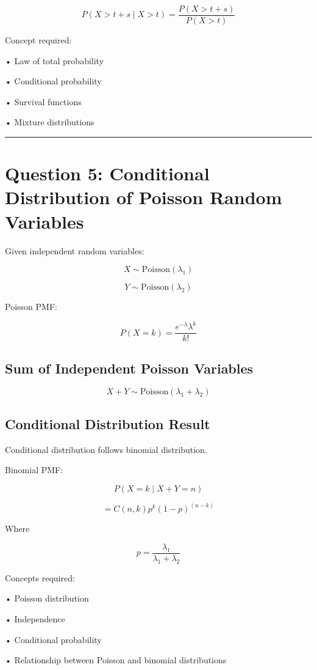 \documentclass[12pt]{article}
\begin{document}
\[
P(X > t + s \mid X > t)
=
\frac{P(X > t + s)}{P(X > t)}
\]

Concept required:

• Law of total probability

• Conditional probability

• Survival functions

• Mixture distributions

\vspace{0.5cm}
\hrule
\vspace{0.5cm}

\section*{Question 5: Conditional Distribution of Poisson Random Variables}

Given independent random variables:

\[
X \sim \text{Poisson}(\lambda_1)
\]

\[
Y \sim \text{Poisson}(\lambda_2)
\]

Poisson PMF:

\[
P(X = k)
=
\frac{e^{−\lambda} \lambda^k}{k!}
\]

\subsection*{Sum of Independent Poisson Variables}

\[
X + Y \sim \text{Poisson}(\lambda_1 + \lambda_2)
\]

\subsection*{Conditional Distribution Result}

Conditional distribution follows binomial distribution.

Binomial PMF:

\[
P(X = k \mid X + Y = n)
\]

\[
=
C(n, k)
p^k
(1 − p)^{(n − k)}
\]

Where

\[
p
=
\frac{\lambda_1}{\lambda_1 + \lambda_2}
\]

Concepts required:

• Poisson distribution

• Independence

• Conditional probability

• Relationship between Poisson and binomial distributions
\end{document}
